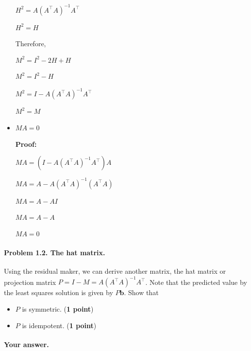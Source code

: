 \documentclass[11pt]{scrartcl}
\newcommand{\bb}{\mathbf{b}}
\begin{document}
\begin{itemize}
		$H^2 = A (A^\intercal A)^{-1} A^\intercal $
		
		$H^2 = H$
		
		Therefore,
		
		$M^2 = I^2 - 2H + H$
		
		$M^2 = I^2 - H$
		
		$M^2 = I - A (A^\intercal A)^{-1} A^\intercal$
		
		$M^2 = M$
		
		\item $MA = 0$
		
		\textbf{Proof:}
		
		$MA = \left(I - A (A^\intercal A)^{-1} A^\intercal\right) A$
		
		$MA = A - A (A^\intercal A)^{-1} (A^\intercal A)$
		
		$MA = A - AI$
		
		$MA = A - A$
		
		$MA = 0$
	\end{itemize}
	
	
	
	
	
	\paragraph{Problem 1.2. The hat matrix.} Using the residual maker, we can derive another matrix, the hat matrix or projection matrix $P = I - M =  A (A^\intercal A)^{-1} A^\intercal$. Note that the predicted value by the least squares solution is given by $P \bb$.
	Show that 
	\begin{itemize}
		\item $P$ is symmetric. (\textbf{1 point})
		\item $P$ is idempotent. (\textbf{1 point})
	\end{itemize}
	
	\paragraph{Your answer.}
	
\end{document}
